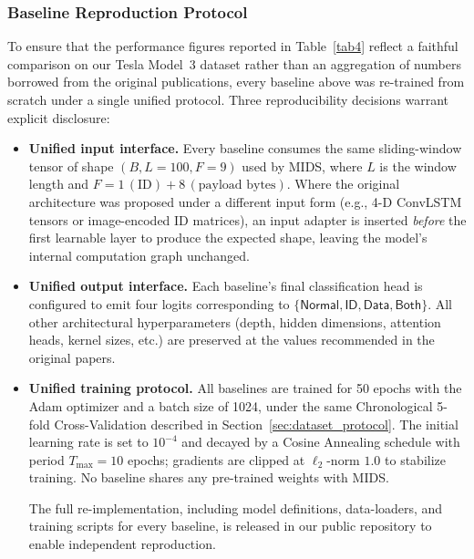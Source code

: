 \documentclass[lettersize,journal]{IEEEtran}
\begin{document}
\subsubsection{Baseline Reproduction Protocol}
\label{sec:repro}

To ensure that the performance figures reported in Table~\ref{tab4}
reflect a faithful comparison on our Tesla Model~3 dataset rather 
than an aggregation of numbers borrowed from the original 
publications, every baseline above was re-trained from scratch 
under a single unified protocol. Three reproducibility decisions 
warrant explicit disclosure:

\begin{itemize}[leftmargin=*, nosep]
\item \textbf{Unified input interface.} Every baseline consumes 
the same sliding-window tensor of shape $(B, L=100, F=9)$ used by 
MIDS, where $L$ is the window length and $F = 1\,(\text{ID}) + 
8\,(\text{payload bytes})$. Where the original architecture was 
proposed under a different input form (e.g., 4-D ConvLSTM tensors 
or image-encoded ID matrices), an input adapter is inserted 
\emph{before} the first learnable layer to produce the expected 
shape, leaving the model's internal computation graph unchanged.

\item \textbf{Unified output interface.} Each baseline's final 
classification head is configured to emit four logits corresponding 
to $\{\textsf{Normal}, \textsf{ID}, \textsf{Data}, \textsf{Both}\}$. 
All other architectural hyperparameters (depth, hidden dimensions, 
attention heads, kernel sizes, etc.) are preserved at the values 
recommended in the original papers.

\item \textbf{Unified training protocol.} All baselines are 
trained for 50 epochs with the Adam optimizer and a batch size of 
1024, under the same Chronological 5-fold Cross-Validation 
described in Section~\ref{sec:dataset_protocol}. The initial 
learning rate is set to $10^{-4}$ and decayed by a Cosine 
Annealing schedule with period $T_{\max}=10$ epochs; gradients 
are clipped at $\ell_2$-norm $1.0$ to stabilize training. No 
baseline shares any pre-trained weights with MIDS.

The full re-implementation, including model definitions, 
data-loaders, and training scripts for every baseline, is released 
in our public repository to enable independent reproduction.
\end{itemize}
\end{document}
